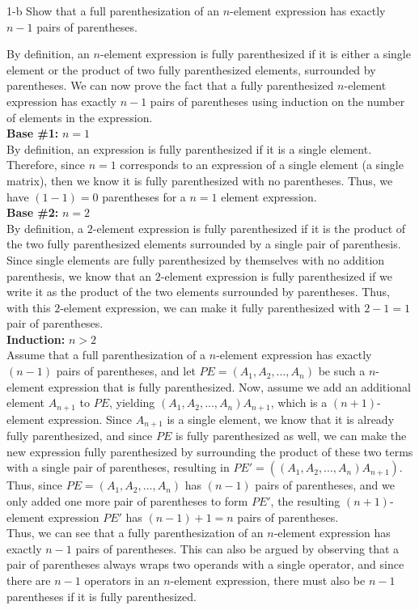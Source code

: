 \documentclass[11pt]{article}
\begin{document}
\begin{prob}{1-b}
Show that a full parenthesization of an $n$-element expression has exactly $n-1$ pairs of parentheses.
\end{prob}
\begin{sol}

By definition, an $n$-element expression is fully parenthesized if it is either a single element or the product of two fully parenthesized elements, surrounded by parentheses. We can now prove the fact that a fully parenthesized $n$-element expression has exactly $n-1$ pairs of parentheses using induction on the number of elements in the expression. \\
\textbf{Base \#1:} $n = 1$ \\
By definition, an expression is fully parenthesized if it is a single element. Therefore, since $n=1$ corresponds to an expression of a single element (a single matrix), then we know it is fully parenthesized with no parentheses. Thus, we have $(1-1) = 0$ parentheses for a $n = 1$ element expression.\\
\textbf{Base \#2:} $n = 2$ \\
By definition, a $2$-element expression is fully parenthesized if it is the product of the two fully parenthesized elements surrounded by a single pair of parenthesis. Since single elements are fully parenthesized by themselves with no addition parenthesis, we know that an $2$-element expression is fully parenthesized if we write it as the product of the two elements surrounded by parentheses. Thus, with this $2$-element expression, we can make it fully parenthesized with $2-1 = 1$ pair of parentheses. \\
\textbf{Induction:} $n > 2$ \\
Assume that a full parenthesization of a $n$-element expression has exactly $(n-1)$ pairs of parentheses, and let $PE = (A_1, A_2, ..., A_{n})$ be such a $n$-element expression that is fully parenthesized. Now, assume we add an additional element $A_{n+1}$ to $PE$, yielding $(A_1, A_2, ..., A_{n})A_{n+1}$, which is a $(n+1)$-element expression. Since $A_{n+1}$ is a single element, we know that it is already fully parenthesized, and since $PE$ is fully parenthesized as well, we can make the new expression fully parenthesized by surrounding the product of these two terms with a single pair of parentheses, resulting in $PE' = ((A_1, A_2, ..., A_{n})A_{n+1})$. Thus, since $PE = (A_1, A_2, ..., A_{n})$ has $(n - 1)$ pairs of parentheses, and we only added one more pair of parentheses to form $PE'$, the resulting $(n+1)$-element expression $PE'$ has $(n - 1) + 1 = n$ pairs of parentheses. \\ 

Thus, we can see that a fully parenthesization of an $n$-element expression has exactly $n-1$ pairs of parentheses. This can also be argued by observing that a pair of parentheses always wraps two operands with a single operator, and since there are $n-1$ operators in an $n$-element expression, there must also be $n-1$ parentheses if it is fully parenthesized.
\end{sol}
\end{document}
